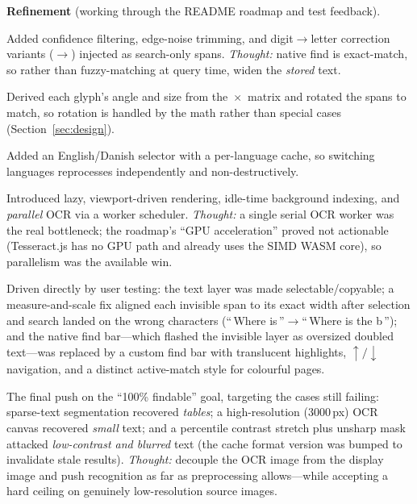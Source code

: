\noindent\textbf{Refinement} (working through the README roadmap and test feedback).
\begin{description}[leftmargin=1.4em, style=nextline, itemsep=4pt]
  \item[Phase 6 --- OCR accuracy: correction variants.] Added confidence
        filtering, edge-noise trimming, and digit$\rightarrow$letter correction
        variants ($\rightarrow$) injected as search-only
        spans. \emph{Thought:} native find is exact-match, so rather than
        fuzzy-matching at query time, widen the \emph{stored} text.
  \item[Phase 7 --- Rotated pages.] Derived each glyph's angle and size from the
        \,$\times$\, matrix and
        rotated the spans to match, so rotation is handled by the math rather
        than special cases (Section~\ref{sec:design}).
  \item[Phase 8 --- Multi-language OCR.] Added an English/Danish selector with a
        per-language cache, so switching languages reprocesses independently and
        non-destructively.
  \item[Phase 9 --- Performance on large PDFs.] Introduced lazy,
        viewport-driven rendering, idle-time background indexing, and
        \emph{parallel} OCR via a worker scheduler. \emph{Thought:} a single
        serial OCR worker was the real bottleneck; the roadmap's ``GPU
        acceleration'' proved not actionable (Tesseract.js has no GPU path and
        already uses the SIMD WASM core), so parallelism was the available win.
  \item[Phase 10 --- Readability \& search UX.] Driven directly by user testing:
        the text layer was made selectable/copyable; a measure-and-scale fix
        aligned each invisible span to its exact width after selection and search
        landed on the wrong characters (``\,Where is\,''$\rightarrow$``\,Where is
        the b\,''); and the native find bar---which flashed the invisible layer
        as oversized doubled text---was replaced by a custom find bar with
        translucent highlights, $\uparrow/\downarrow$ navigation, and a distinct
        active-match style for colourful pages.
  \item[Phase 11 --- OCR image preprocessing.] The final push on the
        ``100\% findable'' goal, targeting the cases still failing: sparse-text
        segmentation recovered \emph{tables}; a high-resolution (3000\,px) OCR
        canvas recovered \emph{small} text; and a percentile contrast stretch
        plus unsharp mask attacked \emph{low-contrast and blurred} text (the
        cache format version was bumped to invalidate stale results).
        \emph{Thought:} decouple the OCR image from the display image and push
        recognition as far as preprocessing allows---while accepting a hard
        ceiling on genuinely low-resolution source images.
\end{description}

